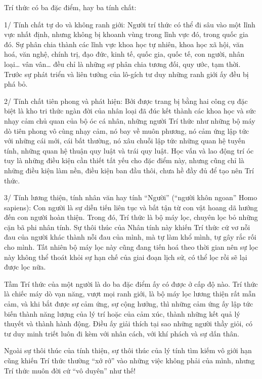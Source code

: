 Trí thức có ba đặc điểm, hay ba tính chất:

1/ Tính chất tự do và không ranh giới: Người trí thức có thể đi sâu vào một lĩnh vực nhất định, nhưng không bị khoanh vùng trong lĩnh vực đó, trong quốc gia đó. Sự phân chia thành các lĩnh vực khoa học tự nhiên, khoa học xã hội, văn hoá, văn nghệ, chính trị, đạo đức, kinh tế, quốc gia, quốc tế, con người, nhân loại… vân vân… đều chỉ là những sự phân chia tương đối, quy ước, tạm thời. Trước sự phát triển và liên tưởng của lô-gích tư duy những ranh giới ấy đều bị phá bỏ.

2/ Tính chất tiên phong và phát hiện: Bởi được trang bị bằng hai công cụ đặc biệt là kho tri thức ngàn đời của nhân loại đã đúc kết thành các khoa học và sức nhạy cảm chủ quan của bộ óc cá nhân, những người Trí thức như những bộ máy dò tiên phong vô cùng nhạy cảm, nó bay về muôn phương, nó cảm ứng lập tức với những cái mới, cái bất thường, nó xâu chuỗi lập tức những quan hệ tuyến tính, những quan hệ thuận quy luật và trái quy luật. Học vấn và lao động trí óc tuy là những điều kiện cần thiết tất yếu cho đặc điểm này, nhưng cũng chỉ là những điều kiện làm nền, điều kiện ban đầu thôi, chưa hề đầy đủ để tạo nên Trí thức.

3/ Tính lương thiện, tính nhân văn hay tính “Người” (“người khôn ngoan” Homo sapiens): Con người là sự diễn tiến liên tục và bất tận từ con vật hoang dã hướng đến con người hoàn thiện. Trong đó, Trí thức là bộ máy lọc, chuyên lọc bỏ những cặn bã phi nhân tính. Sự thôi thúc của Nhân tính này khiến Trí thức cứ vơ nỗi đau của người khác thành nỗi đau của mình, mà tự làm khổ mình, tự gây rắc rối cho mình. Tất nhiên bộ máy lọc này cũng đang tiến hoá theo thời gian nên sự lọc này không thể thoát khỏi sự hạn chế của giai đoạn lịch sử, có thể lọc rồi sẽ lại được lọc nữa.

Tầm Trí thức của một người là do ba đặc điểm ấy có được ở cấp độ nào. Trí thức là chiếc máy dò vạn năng, vượt mọi ranh giới, là bộ máy lọc lương thiện rất mẫn cảm, và khi bắt được sự cảm ứng, sự cộng hưởng, thì những cảm ứng ấy lập tức biến thành năng lượng của lý trí hoặc của cảm xúc, thành những kết quả lý thuyết và thành hành động. Điều ấy giải thích tại sao những người thầy giỏi, có tư duy minh triết luôn đi kèm với nhân cách, với khí phách và sự dấn thân.

Ngoài sự thôi thúc của tính thiện, sự thôi thúc của lý tính tìm kiếm vô giới hạn cũng khiến Trí thức thường “xớ rớ” vào những việc không phải của mình, nhưng Trí thức muôn đời cứ “vô duyên” như thế!

